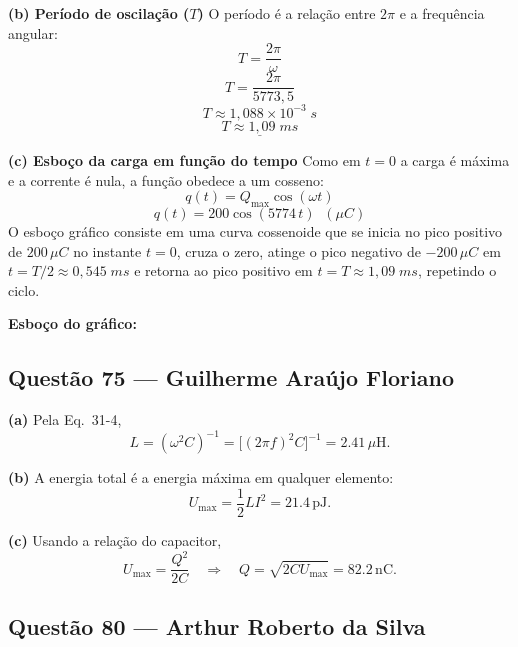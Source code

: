 \documentclass[12pt,a4paper]{article}
\begin{document}
\vspace{0.2cm}
\textbf{(b) Período de oscilação (\(T\))}
O período é a relação entre \(2\pi\) e a frequência angular:
\[T = \frac{2\pi}{\omega}\]
\[T = \frac{2\pi}{5773,5}\]
\[T \approx 1,088 \times 10^{-3}\;s\]
\[\underline{T \approx 1,09\;ms}\]

\vspace{0.2cm}
\textbf{(c) Esboço da carga em função do tempo}
Como em \(t = 0\) a carga é máxima e a corrente é nula, a função obedece a um cosseno:
\[q(t) = Q_{\max} \cos(\omega t)\]
\[q(t) = 200 \cos(5774\,t)\;\;(\mu C)\]
O esboço gráfico consiste em uma curva cossenoide que se inicia no pico positivo de \(200\,\mu C\) no instante \(t = 0\), cruza o zero, atinge o pico negativo de \(-200\,\mu C\) em \(t = T/2 \approx 0,545\;ms\) e retorna ao pico positivo em \(t = T \approx 1,09\;ms\), repetindo o ciclo.


\vspace{0.5cm}
\textbf{Esboço do gráfico:}

\begin{center}
\end{center}

\subsection{Questão 75 — Guilherme Araújo Floriano}

\textbf{(a)} Pela Eq.~31-4,
\[
L = (\omega^2C)^{-1} = \bigl[(2\pi f)^2C\bigr]^{-1}=2.41\,\mu\mathrm{H}.
\]

\textbf{(b)} A energia total é a energia máxima em qualquer elemento:
\[
U_{\max} = \frac{1}{2}LI^2 = 21.4\,\mathrm{pJ}.
\]

\textbf{(c)} Usando a relação do capacitor,
\[
U_{\max} = \frac{Q^2}{2C}
\quad\Rightarrow\quad
Q = \sqrt{2CU_{\max}} = 82.2\,\mathrm{nC}.
\]

\subsection{Questão 80 — Arthur Roberto da Silva}
\end{document}
